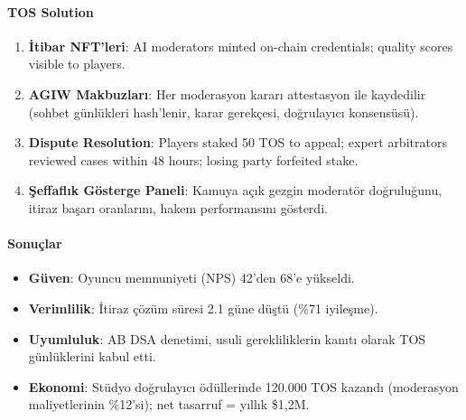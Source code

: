 \documentclass[11pt]{article}
\begin{document}
\begin{itemize}[noitemsep]
\begin{itemize}[noitemsep]
\begin{itemize}[noitemsep]
\begin{itemize}[noitemsep]
\begin{itemize}[noitemsep]
\begin{itemize}[noitemsep]
\begin{itemize}[noitemsep]
\begin{enumerate}[noitemsep]
\begin{itemize}[noitemsep]
\paragraph{TOS Solution}
\begin{enumerate}[noitemsep]
  \item \textbf{İtibar NFT'leri}: AI moderators minted on-chain credentials; quality scores visible to players.
  \item \textbf{AGIW Makbuzları}: Her moderasyon kararı attestasyon ile kaydedilir (sohbet günlükleri hash'lenir, karar gerekçesi, doğrulayıcı konsensüsü).
  \item \textbf{Dispute Resolution}: Players staked 50 TOS to appeal; expert arbitrators reviewed cases within 48 hours; losing party forfeited stake.
  \item \textbf{Şeffaflık Gösterge Paneli}: Kamuya açık gezgin moderatör doğruluğunu, itiraz başarı oranlarını, hakem performansını gösterdi.
\end{enumerate}

\paragraph{Sonuçlar}
\begin{itemize}[noitemsep]
  \item \textbf{Güven}: Oyuncu memnuniyeti (NPS) 42'den 68'e yükseldi.
  \item \textbf{Verimlilik}: İtiraz çözüm süresi 2.1 güne düştü (\%71 iyileşme).
  \item \textbf{Uyumluluk}: AB DSA denetimi, usuli gerekliliklerin kanıtı olarak TOS günlüklerini kabul etti.
  \item \textbf{Ekonomi}: Stüdyo doğrulayıcı ödüllerinde 120.000 TOS kazandı (moderasyon maliyetlerinin \%12'si); net tasarruf = yıllık \$1,2M.
\end{itemize}


\end{itemize}
\end{enumerate}
\end{itemize}
\end{itemize}
\end{itemize}
\end{itemize}
\end{itemize}
\end{itemize}
\end{itemize}
\end{document}

